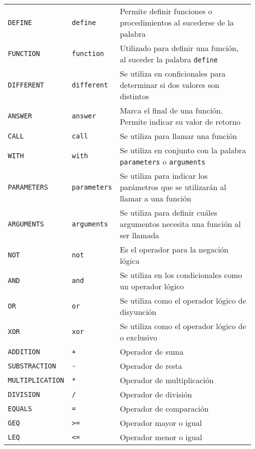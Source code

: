 \documentclass[titlepage]{article}
\begin{document}
\begin{longtable}{p{}p{}p{}}
            \texttt{DEFINE} & \texttt{define} & Permite definir funciones o procedimientos al sucederse de la palabra \\
            \texttt{FUNCTION} & \texttt{function} & Utilizado para definir una función, al suceder la palabra \texttt{define}\\
            \texttt{DIFFERENT} & \texttt{different} & Se utiliza en conficionales para determinar si dos valores son distintos\\
            \texttt{ANSWER} & \texttt{answer} & Marca el final de una función. Permite indicar su valor de retorno \\
            \texttt{CALL} & \texttt{call} & Se utiliza para llamar una función\\
            \texttt{WITH} & \texttt{with} & Se utiliza en conjunto con la palabra \texttt{parameters} o \texttt{arguments}\\
            \texttt{PARAMETERS} & \texttt{parameters} & Se utiliza para indicar los parámetros que se utilizarán al llamar a una función\\
            \texttt{ARGUMENTS} & \texttt{arguments} & Se utiliza para definir cuáles argumentos necesita una función al ser llamada\\
            \texttt{NOT} & \texttt{not} & Es el operador para la negación lógica\\
            \texttt{AND} & \texttt{and} & Se utiliza en los condicionales como un operador lógico \\
            \texttt{OR} & \texttt{or} & Se utiliza como el operador lógico de disyunción\\
            \texttt{XOR} & \texttt{xor} & Se utiliza como el operador lógico de o exclusivo\\
            \texttt{ADDITION} & \texttt{+} & Operador de suma \\
            \texttt{SUBSTRACTION} & \texttt{-} & Operador de resta \\
            \texttt{MULTIPLICATION} & \texttt{*} & Operador de multiplicación \\
            \texttt{DIVISION} & \texttt{/} & Operador de división \\
            \texttt{EQUALS} & \texttt{=} & Operador de comparación \\
            \texttt{GEQ} & \texttt{>=} & Operador mayor o igual\\
            \texttt{LEQ} & \texttt{<=} & Operador menor o igual\\

\end{longtable}
\end{document}
